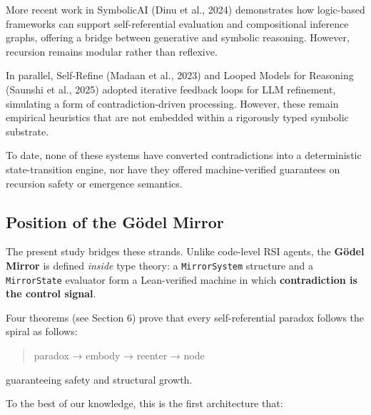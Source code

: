 \documentclass[manuscript,nonacm]{acmart}
\begin{document}
More recent work in SymbolicAI (Dinu et al., 2024)\cite{dinu2024symbolicai} demonstrates how logic-based frameworks can support self-referential evaluation and compositional inference graphs, offering a bridge between generative and symbolic reasoning. However, recursion remains modular rather than reflexive.

In parallel, Self-Refine (Madaan et al., 2023)\cite{madaan2023selfrefine} and Looped Models for Reasoning (Saunshi et al., 2025)\cite{saunshi2025looped} adopted iterative feedback loops for LLM refinement, simulating a form of contradiction-driven processing. However, these remain empirical heuristics that are not embedded within a rigorously typed symbolic substrate.

To date, none of these systems have converted contradictions into a deterministic state-transition engine, nor have they offered machine-verified guarantees on recursion safety or emergence semantics.

\subsection{Position of the Gödel Mirror}
The present study bridges these strands. Unlike code-level RSI agents, the \textbf{Gödel Mirror} is defined \textit{inside} type theory: a \texttt{MirrorSystem} structure and a \texttt{MirrorState} evaluator form a Lean-verified machine in which \textbf{contradiction is the control signal}.

Four theorems (see Section 6) prove that every self-referential paradox follows the spiral as follows:

\begin{quote}
paradox → embody → reenter → node
\end{quote}

guaranteeing safety and structural growth.

To the best of our knowledge, this is the first architecture that:
\end{document}
